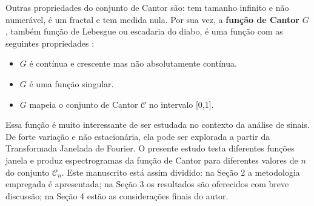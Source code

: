 Outras propriedades do conjunto de Cantor são: tem tamanho infinito e não numerável, é um fractal e tem medida nula. Por sua vez, a \textbf{função de Cantor} $G$, também função de Lebesgue ou escadaria do diabo, é uma função com as seguintes propriedades \cite{dovgoshey2006cantor}: 
\begin{itemize}
\item $G$ é contínua e crescente mas não absolutamente contínua.
\item $G$ é uma função singular.
\item $G$ mapeia o conjunto de Cantor $\mathcal{C}$ no intervalo [0,1].
\end{itemize}

Essa função é muito interessante de ser estudada no contexto da análise de sinais. De forte variação e não estacionária, ela pode ser explorada a partir da Transformada Janelada de Fourier. O presente estudo testa diferentes funções janela e produz espectrogramas da função de Cantor para diferentes valores de $n$ do conjunto $\mathcal{C}_{n}$. Este manuscrito está assim dividido: na Seção 2 a metodologia empregada é apresentada; na Seção 3 os resultados são oferecidos com breve discussão; na Seção 4 estão as considerações finais do autor.





